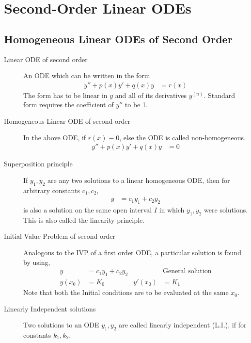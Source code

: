 \chapter{Second-Order Linear ODEs}
\section{Homogeneous Linear ODEs of Second Order}

\begin{description}
    \item[Linear ODE of second order] An ODE which can be written in the form
        \begin{align}
            y'' + p(x)y' + q(x)y & = r(x)
        \end{align}
        The form has to be linear in $ y $ and all of its derivatives $ y^{(n)} $. Standard form
        requires the coefficient of $ y'' $ to be 1.
    \item[Homogeneous Linear ODE of second order] In the above ODE, if $ r(x) \equiv 0$, else
        the ODE is called non-homogeneous.
        \begin{align}
            y'' + p(x)y' + q(x)y & = 0
        \end{align}
    \item[Superposition principle] If $ y_{1}, y_{2} $ are any two solutions to a linear
        homogeneous ODE, then for arbitrary constants $ c_{1}, c_{2} $,
        \begin{align}
            y & = c_{1}y_{1} + c_{2}y_{2}
        \end{align}
        is also a solution on the same open interval $ I $ in which $ y_{1}, y_{2} $ were
        solutions. This is also called the linearity principle.
    \item[Initial Value Problem of second order] Analogous to the IVP of a first order ODE,
        a particular solution is found by using,
        \begin{align}
            y        & = c_{1}y_{1} + c_{2}y_{2} &           & \text{General solution} \\
            y(x_{0}) & = K_{0}                   & y'(x_{0}) & = K_{1}
        \end{align}
        Note that both the Initial conditions are to be evaluated at the same $ x_{0} $.
    \item[Linearly Independent solutions] Two solutions to an ODE $ y_{1}, y_{2} $ are
        called linearly independent (L.I.), if for constants $ k_{1}, k_{2} $,
        \begin{align}

\end{align}
\end{description}
